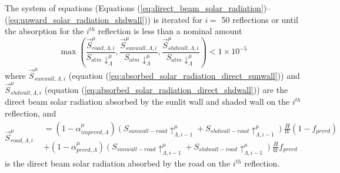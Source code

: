 \documentclass[12pt,authoryear]{elsarticle}
\numberwithin{equation}{section} %
\begin{document}
The system of equations (Equations (\ref{eq:direct_beam_solar_radiation})--(\ref{eq:upward_solar_radiation_shdwall})) is iterated for $i =$ 50 reflections or until the absorption for the $i^{th}$ reflection is less than a nominal amount
\begin{equation}
\max\left(\frac{\overrightarrow{S}_{road,\Lambda,i}^{\mu}}{S_{atm}\downarrow_{\Lambda}^{\mu}}, \frac{\overrightarrow{S}_{sunwall,\Lambda,i}^{\mu}}{S_{atm}\downarrow_{\Lambda}^{\mu}}, \frac{\overrightarrow{S}_{shdwall,\Lambda,i}^{\mu}}{S_{atm}\downarrow_{\Lambda}^{\mu}}\right)<1\times10^{-5}
\end{equation}
where $\overrightarrow{S}_{sunwall,\Lambda,i}^{\mu}$ (equation (\ref{eq:absorbed_solar_radiation_direct_sunwall})) and $\overrightarrow{S}_{shdwall,\Lambda,i}^{\mu}$ (equation (\ref{eq:absorbed_solar_radiation_direct_shdwall})) are the direct beam solar radiation absorbed by the sunlit wall and shaded wall on the $i^{th}$ reflection, and
\begin{equation}
\overrightarrow{S}_{road,\Lambda,i}^{\mu} 
\begin{aligned}
&= (1-\alpha_{imprvrd,\Lambda}^{\mu})(S_{sunwall-road}\uparrow_{\Lambda,i-1}^{\mu}+S_{shdwall-road}\uparrow_{\Lambda,i-1}^{\mu})\frac{H}{W}(1-f_{prvrd})\\
&+(1-\alpha_{prvrd,\Lambda}^{\mu})(S_{sunwall-road}\uparrow_{\Lambda,i-1}^{\mu}+S_{shdwall-road}\uparrow_{\Lambda,i-1}^{\mu})\frac{H}{W}f_{prvrd}
\end{aligned}
\end{equation}
is the direct beam solar radiation absorbed by the road on the $i^{th}$ reflection.
\end{document}
